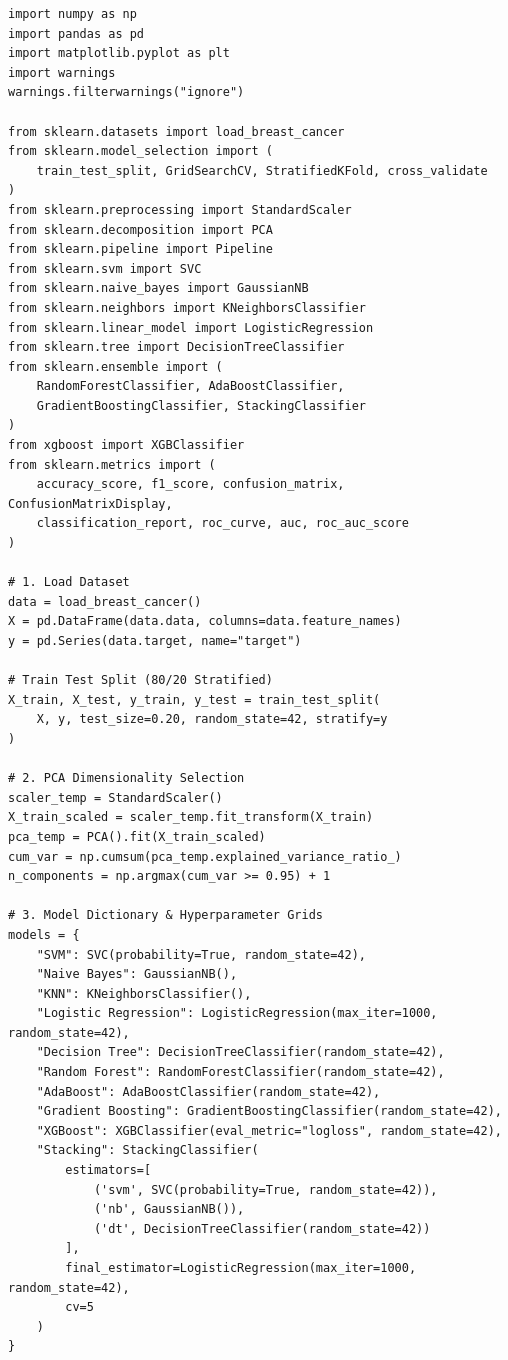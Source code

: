 \documentclass[12pt,a4paper]{article}
\begin{document}
\begin{lstlisting}
import numpy as np
import pandas as pd
import matplotlib.pyplot as plt
import warnings
warnings.filterwarnings("ignore")

from sklearn.datasets import load_breast_cancer
from sklearn.model_selection import (
    train_test_split, GridSearchCV, StratifiedKFold, cross_validate
)
from sklearn.preprocessing import StandardScaler
from sklearn.decomposition import PCA
from sklearn.pipeline import Pipeline
from sklearn.svm import SVC
from sklearn.naive_bayes import GaussianNB
from sklearn.neighbors import KNeighborsClassifier
from sklearn.linear_model import LogisticRegression
from sklearn.tree import DecisionTreeClassifier
from sklearn.ensemble import (
    RandomForestClassifier, AdaBoostClassifier, 
    GradientBoostingClassifier, StackingClassifier
)
from xgboost import XGBClassifier
from sklearn.metrics import (
    accuracy_score, f1_score, confusion_matrix, ConfusionMatrixDisplay,
    classification_report, roc_curve, auc, roc_auc_score
)

# 1. Load Dataset
data = load_breast_cancer()
X = pd.DataFrame(data.data, columns=data.feature_names)
y = pd.Series(data.target, name="target")

# Train Test Split (80/20 Stratified)
X_train, X_test, y_train, y_test = train_test_split(
    X, y, test_size=0.20, random_state=42, stratify=y
)

# 2. PCA Dimensionality Selection
scaler_temp = StandardScaler()
X_train_scaled = scaler_temp.fit_transform(X_train)
pca_temp = PCA().fit(X_train_scaled)
cum_var = np.cumsum(pca_temp.explained_variance_ratio_)
n_components = np.argmax(cum_var >= 0.95) + 1

# 3. Model Dictionary & Hyperparameter Grids
models = {
    "SVM": SVC(probability=True, random_state=42),
    "Naive Bayes": GaussianNB(),
    "KNN": KNeighborsClassifier(),
    "Logistic Regression": LogisticRegression(max_iter=1000, random_state=42),
    "Decision Tree": DecisionTreeClassifier(random_state=42),
    "Random Forest": RandomForestClassifier(random_state=42),
    "AdaBoost": AdaBoostClassifier(random_state=42),
    "Gradient Boosting": GradientBoostingClassifier(random_state=42),
    "XGBoost": XGBClassifier(eval_metric="logloss", random_state=42),
    "Stacking": StackingClassifier(
        estimators=[
            ('svm', SVC(probability=True, random_state=42)),
            ('nb', GaussianNB()),
            ('dt', DecisionTreeClassifier(random_state=42))
        ],
        final_estimator=LogisticRegression(max_iter=1000, random_state=42),
        cv=5
    )
}


\end{lstlisting}
\end{document}
